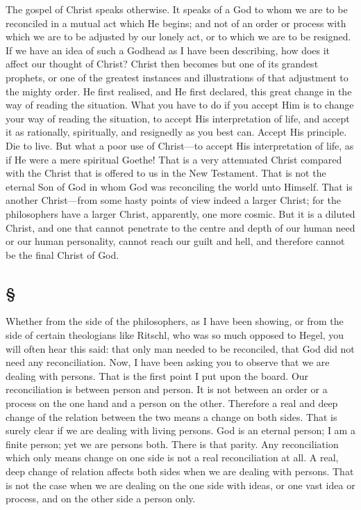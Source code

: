 \documentclass[draft]{ptfdoc}
\begin{document}
The gospel of Christ speaks otherwise. It 
speaks of a God to whom we are to be reconciled 
in a mutual act which He begins; and not of 
an order or process with which we are to be 
adjusted by our lonely act, or to which we are 
to be resigned. If we have an idea of such a 
Godhead as I have been describing, how does 
it affect our thought of Christ? Christ then 
becomes but one of its grandest prophets, or 
one of the greatest instances and illustrations of 
that adjustment to the mighty order. He first 
realised, and He first declared, this great change 
in the way of reading the situation. What you 
have to do if you accept Him is to change your 
way of reading the situation, to accept His 
interpretation of life, and accept it as rationally, 
spiritually, and resignedly as you best can. 
Accept His principle. Die to live. But what a 
poor use of Christ---to accept His interpretation 
of life, as if He were a mere spiritual Goethe! 
That is a very attenuated Christ compared with 
the Christ that is offered to us in the New 
Testament. That is not the eternal Son of God 
in whom God was reconciling the world unto 
Himself. That is another Christ---from some 
hasty points of view indeed a larger Christ; 
for the philosophers have a larger Christ, apparently,
one more cosmic. But it is a diluted 
Christ, and one that cannot penetrate to the 
centre and depth of our human need or our 
human personality, cannot reach our guilt and 
hell, and therefore cannot be the final Christ 
of God. 

\subsection*{
\S
}

Whether from the side of the philosophers, as 
I have been showing, or from the side of certain 
theologians like Ritschl, who was so much 
opposed to Hegel, you will often hear this 
said: that only man needed to be reconciled, 
that God did not need any reconciliation. 
Now, I have been asking you to observe that 
we are dealing with persons. That is the first 
point I put upon the board. Our reconciliation 
is between person and person. It is not 
between an order or a process on the one hand 
and a person on the other. Therefore a real 
and deep change of the relation between the 
two means a change on both sides. That is 
surely clear if we are dealing with living persons. 
God is an eternal person; I am a finite 
person; yet we are persons both. There is that 
parity. Any reconciliation which only means 
change on one side is not a real reconciliation 
at all. A real, deep change of relation affects 
both sides when we are dealing with persons. 
That is not the case when we are dealing on 
the one side with ideas, or one vast idea 
or process, and on the other side a person 
only. 
\end{document}
